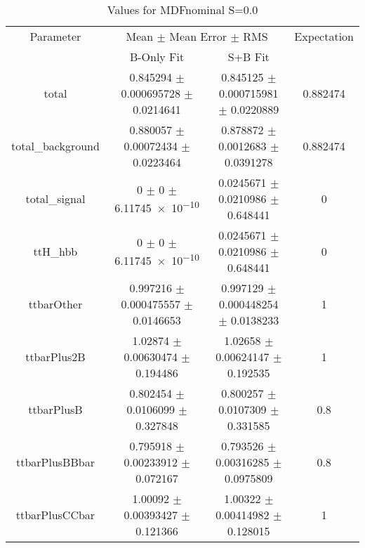 \begin{table}
\centering
\caption{Values for MDFnominal S=0.0}
\begin{tabular}{cccc}
\toprule
Parameter & \multicolumn{2}{c}{Mean $\pm$ Mean Error $\pm$ RMS} & Expectation\\
 & B-Only Fit & S+B Fit & \\
\midrule
total & \num{0.845294} $\pm$ \num{0.000695728} $\pm$ \num{0.0214641} & \num{0.845125} $\pm$ \num{0.000715981} $\pm$ \num{0.0220889} & \num{0.882474}\\
total\_background & \num{0.880057} $\pm$ \num{0.00072434} $\pm$ \num{0.0223464} & \num{0.878872} $\pm$ \num{0.0012683} $\pm$ \num{0.0391278} & \num{0.882474}\\
total\_signal & \num{0} $\pm$ \num{0} $\pm$ \num{6.11745e-10} & \num{0.0245671} $\pm$ \num{0.0210986} $\pm$ \num{0.648441} & \num{0}\\
ttH\_hbb & \num{0} $\pm$ \num{0} $\pm$ \num{6.11745e-10} & \num{0.0245671} $\pm$ \num{0.0210986} $\pm$ \num{0.648441} & \num{0}\\
ttbarOther & \num{0.997216} $\pm$ \num{0.000475557} $\pm$ \num{0.0146653} & \num{0.997129} $\pm$ \num{0.000448254} $\pm$ \num{0.0138233} & \num{1}\\
ttbarPlus2B & \num{1.02874} $\pm$ \num{0.00630474} $\pm$ \num{0.194486} & \num{1.02658} $\pm$ \num{0.00624147} $\pm$ \num{0.192535} & \num{1}\\
ttbarPlusB & \num{0.802454} $\pm$ \num{0.0106099} $\pm$ \num{0.327848} & \num{0.800257} $\pm$ \num{0.0107309} $\pm$ \num{0.331585} & \num{0.8}\\
ttbarPlusBBbar & \num{0.795918} $\pm$ \num{0.00233912} $\pm$ \num{0.072167} & \num{0.793526} $\pm$ \num{0.00316285} $\pm$ \num{0.0975809} & \num{0.8}\\
ttbarPlusCCbar & \num{1.00092} $\pm$ \num{0.00393427} $\pm$ \num{0.121366} & \num{1.00322} $\pm$ \num{0.00414982} $\pm$ \num{0.128015} & \num{1}\\
\bottomrule
\end{tabular}
\end{table}